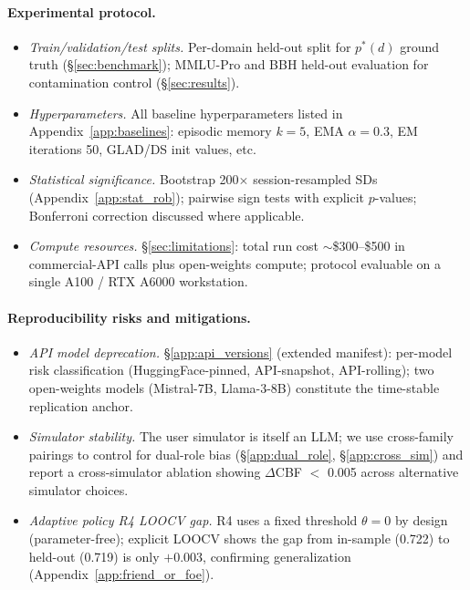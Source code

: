 \documentclass[11pt]{article}
\begin{document}
\paragraph{Experimental protocol.}
\begin{itemize}[nosep,leftmargin=1.4em]
  \item \emph{Train/validation/test splits.} \checkmark{} Per-domain held-out split for $p^*(d)$ ground truth (\S\ref{sec:benchmark}); MMLU-Pro and BBH held-out evaluation for contamination control (\S\ref{sec:results}).
  \item \emph{Hyperparameters.} \checkmark{} All baseline hyperparameters listed in Appendix~\ref{app:baselines}: episodic memory $k=5$, EMA $\alpha=0.3$, EM iterations 50, GLAD/DS init values, etc.
  \item \emph{Statistical significance.} \checkmark{} Bootstrap 200$\times$ session-resampled SDs (Appendix~\ref{app:stat_rob}); pairwise sign tests with explicit $p$-values; Bonferroni correction discussed where applicable.
  \item \emph{Compute resources.} \S\ref{sec:limitations}: total run cost $\sim$\$300--\$500 in commercial-API calls plus open-weights compute; protocol evaluable on a single A100 / RTX A6000 workstation.
\end{itemize}

\paragraph{Reproducibility risks and mitigations.}
\begin{itemize}[nosep,leftmargin=1.4em]
  \item \emph{API model deprecation.} \S\ref{app:api_versions} (extended manifest): per-model risk classification (HuggingFace-pinned, API-snapshot, API-rolling); two open-weights models (Mistral-7B, Llama-3-8B) constitute the time-stable replication anchor.
  \item \emph{Simulator stability.} The user simulator is itself an LLM; we use cross-family pairings to control for dual-role bias (\S\ref{app:dual_role}, \S\ref{app:cross_sim}) and report a cross-simulator ablation showing $\Delta$CBF $<$ 0.005 across alternative simulator choices.
  \item \emph{Adaptive policy R4 LOOCV gap.} \checkmark{} R4 uses a fixed threshold $\theta=0$ by design (parameter-free); explicit LOOCV shows the gap from in-sample (0.722) to held-out (0.719) is only $+0.003$, confirming generalization (Appendix~\ref{app:friend_or_foe}).
\end{itemize}
\end{document}

